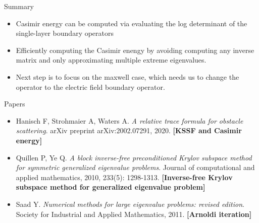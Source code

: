 \documentclass[dvipsnames,10pt]{beamer}
\begin{document}
\begin{frame}{Summary}
\begin{itemize}
    \item Casimir energy can be computed via evaluating the log determinant of the single-layer boundary operators
    
    \item Efficiently computing the Casimir enengy by avoiding computing any inverse matrix and only approximating multiple extreme eigenvalues.
    
    \item Next step is to focus on the maxwell case, which needs us to change the operator to the electric field boundary operator. 
\end{itemize}
\end{frame}
\begin{frame}{Papers}

    \begin{itemize}
        \item Hanisch F, Strohmaier A, Waters A.\textit{ A relative trace formula for obstacle scattering}. arXiv preprint arXiv:2002.07291, 2020. 
        \textbf{[KSSF and Casimir energy]}
        
        \item Quillen P, Ye Q. \textit{A block inverse-free preconditioned Krylov subspace method for symmetric generalized eigenvalue problems}. Journal of computational and applied mathematics, 2010, 233(5): 1298-1313.
        \textbf{[Inverse-free Krylov subspace method for generalized eigenvalue problem]}
        
        \item  Saad Y. \textit{Numerical methods for large eigenvalue problems: revised edition}. Society for Industrial and Applied Mathematics, 2011.
        \textbf{[Arnoldi iteration]}
    \end{itemize}

\end{frame}
\end{document}

